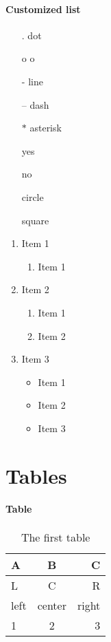 \documentclass[twoside, titlepage]{article}
\begin{document}
\paragraph{Customized list}
\begin{itemize}
\item[.] dot
\item[o] o
\item[-] line
\item[--] dash
\item[$\ast$] asterisk
\item[\ding{51}] yes
\item[\ding{56}] no
\item[\ding{108}] circle
\item[\ding{110}] square
\end{itemize}
\begin{enumerate}[label=(\arabic*)] 
\item Item 1
	\begin{enumerate}[label=\Alph*.] 
	\item Item 1
	\end{enumerate}
\item Item 2
	\begin{enumerate}[label=\roman*.] 
	\item Item 1
	\item Item 2
	\end{enumerate}
\item Item 3
	\begin{itemize}[label=$\circ$] 
	\item Item 1
	\item Item 2
	\item Item 3
	\end{itemize}
\end{enumerate}
\newpage

\thispagestyle{plain}

\section{Tables}
\paragraph{Table}
\begin{table}[h!]
  \begin{center}
		\begin{tabular}{| l | c | r |}
			\hline
			\textbf{A} & \textbf{B} & \textbf{C}\\
			\hline
			L & C & R\\
			left & center & right\\
			\hline
			1 & 2 & 3\\
			\hline
		\end{tabular}
		\caption{The first table}
		\label{table:table1}
  \end{center}
\end{table}
\end{document}
